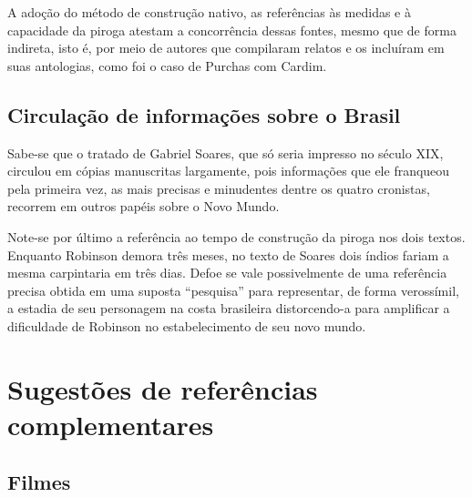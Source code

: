 \documentclass[12pt]{extarticle}
\begin{document}
A adoção do método de construção nativo, as referências às medidas e à
capacidade da piroga atestam a concorrência dessas fontes, mesmo que de
forma indireta, isto é, por meio de autores que compilaram relatos e os
incluíram em suas antologias, como foi o caso de Purchas com Cardim.

\subsection{Circulação de informações sobre o Brasil}

Sabe-se que o tratado de Gabriel Soares, que só seria impresso no século
XIX, circulou em cópias manuscritas largamente, pois informações que ele
franqueou pela primeira vez, as mais precisas e minudentes dentre os
quatro cronistas, recorrem em outros papéis sobre o Novo Mundo.

Note-se por último a referência ao tempo de construção da piroga nos
dois textos. Enquanto Robinson demora três meses, no texto de Soares
dois índios fariam a mesma carpintaria em três dias. Defoe se vale
possivelmente de uma referência precisa obtida em uma suposta
``pesquisa'' para representar, de forma verossímil, a estadia de seu
personagem na costa brasileira distorcendo-a para amplificar a
dificuldade de Robinson no estabelecimento de seu novo mundo.



\pagebreak\section{Sugestões de referências complementares}\label{sugestoes}


\subsection{Filmes}
\end{document}
